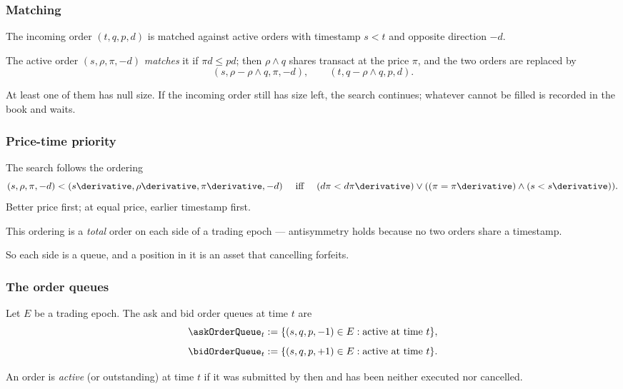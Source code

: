 \begin{frame}
  \frametitle{Matching}
The incoming order $(t,q,p,d)$ is matched against active orders
with timestamp $s<t$ and opposite direction $-d$.

\pause

The active order $(s,\rho,\pi,-d)$ \emph{matches} it if $\pi d \leq p d$;
then $\rho \wedge q$ shares transact at the price $\pi$,
and the two orders are replaced by
\[
(s,\rho - \rho\wedge q, \pi, -d),
\qquad
(t,q - \rho\wedge q, p, d).
\]

\pause

At least one of them has null size.
If the incoming order still has size left, the search continues;
whatever cannot be filled is recorded in the book and waits.
\end{frame}

\begin{frame}
  \frametitle{Price-time priority}
The search follows the ordering
\[
(s,\rho,\pi,-d)<(s\derivative,\rho\derivative,\pi\derivative,-d)
\quad \text{ iff } \quad
(d\pi<d\pi\derivative)\vee((\pi=\pi\derivative)\wedge(s<s\derivative)).
\]
Better price first; at equal price, earlier timestamp first.

\pause

This ordering is a \emph{total} order on each side of a trading epoch ---
antisymmetry holds because no two orders share a timestamp.

\pause

So each side is a queue,
and a position in it is an asset that cancelling forfeits.
\end{frame}

\begin{frame}
  \frametitle{The order queues}
\begin{defi}
\label{def.orderQueue}
Let $E$ be a trading epoch. The ask and bid order queues at time $t$ are
\[
\askOrderQueue_t := \lbrace (s,q,p,-1)\in E : \text{active at time } t \rbrace,
\]
\[
\bidOrderQueue_t := \lbrace (s,q,p,+1)\in E : \text{active at time } t \rbrace.
\]
\end{defi}

\pause

An order is \emph{active} (or outstanding) at time $t$ if it was submitted by then
and has been neither executed nor cancelled.
\end{frame}


